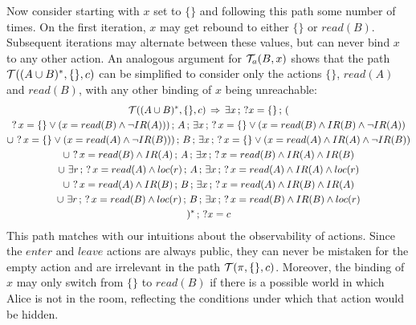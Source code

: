  Now consider starting with $x$ set to $\{\}$ and following this
path some number of times. On the first iteration, $x$ may get rebound
to either $\{\}$ or $read(B)$. Subsequent iterations may alternate
between these values, but can never bind $x$ to any other action.
An analogous argument for $\mathcal{T}_{a}(B,x)$ shows that the path $\mathcal{T}((A\cup B)^{*},\{\},c)$
can be simplified to consider only the actions $\{\}$, $read(A)$
and $read(B)$, with any other binding of $x$ being unreachable:\begin{multline*}
\mathcal{T}((A\cup B)^{*},\{\},c)\,\Rightarrow\,\exists x\,;\,?x=\{\}\,;\,(\\
?\, x=\{\}\vee(x=read(B)\wedge\neg IR(A)))\,;\, A\,;\,\exists x\,;\,?\, x=\{\}\vee(x=read(B)\wedge IR(B)\wedge\neg IR(A))\\
\cup\,\,?\, x=\{\}\vee(x=read(A)\wedge\neg IR(B)))\,;\, B\,;\,\exists x\,;\,?\, x=\{\}\vee(x=read(A)\wedge IR(A)\wedge\neg IR(B))\\
\cup\,\,?\, x=read(B)\wedge IR(A)\,;\, A\,;\,\exists x\,;\,?\, x=read(B)\wedge IR(A)\wedge IR(B)\\
\cup\,\,\exists r\,;\,?\, x=read(A)\wedge loc(r)\,;\, A\,;\,\exists x\,;\,?\, x=read(A)\wedge IR(A)\wedge loc(r)\\
\cup\,\,?\, x=read(A)\wedge IR(B)\,;\, B\,;\,\exists x\,;\,?\, x=read(A)\wedge IR(B)\wedge IR(A)\\
\cup\,\,\exists r\,;\,?\, x=read(B)\wedge loc(r)\,;\, B\,;\,\exists x\,;\,?\, x=read(B)\wedge IR(B)\wedge loc(r)\\
)^{*}\,;\,?x=c\end{multline*}
 This path matches with our intuitions about the observability of
actions. Since the $enter$ and $leave$ actions are always public,
they can never be mistaken for the empty action and are irrelevant
in the path $\mathcal{T}(\pi,\{\},c)$. Moreover, the binding of $x$ may
only switch from $\{\}$ to $read(B)$ if there is a possible world
in which Alice is not in the room, reflecting the conditions under
which that action would be hidden.

